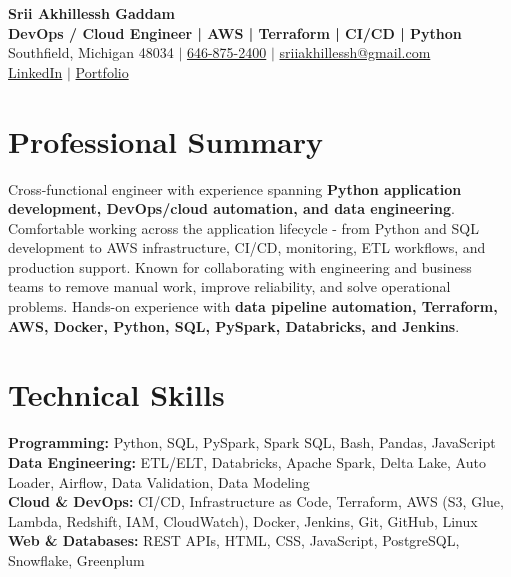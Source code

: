\documentclass[letterpaper,10pt]{article}
\begin{document}
\fontsize{9.35pt}{10.45pt}\selectfont

\begin{center}
    {\LARGE \textbf{Srii Akhillessh Gaddam}} \\[-1pt]
    \textbf{DevOps / Cloud Engineer | AWS | Terraform | CI/CD | Python} \\[2pt]
    Southfield, Michigan 48034 $|$
    \href{tel:6468752400}{646-875-2400} $|$
    \href{mailto:sriiakhillessh@gmail.com}{sriiakhillessh@gmail.com} \\[1pt]
    \href{https://www.linkedin.com/in/srii-akhiilessh-gaddam-b48668191/}{LinkedIn} $|$
    \href{https://sriiakhillesshg.github.io/portfolio/}{Portfolio}
\end{center}
\vspace{-8pt}

\section{Professional Summary}
\small{Cross-functional engineer with experience spanning \textbf{Python application development, DevOps/cloud automation, and data engineering}. Comfortable working across the application lifecycle - from Python and SQL development to AWS infrastructure, CI/CD, monitoring, ETL workflows, and production support. Known for collaborating with engineering and business teams to remove manual work, improve reliability, and solve operational problems. Hands-on experience with \textbf{data pipeline automation, Terraform, AWS, Docker, Python, SQL, PySpark, Databricks, and Jenkins}.}

\section{Technical Skills}
\small{
\textbf{Programming:} Python, SQL, PySpark, Spark SQL, Bash, Pandas, JavaScript \\
\textbf{Data Engineering:} ETL/ELT, Databricks, Apache Spark, Delta Lake, Auto Loader, Airflow, Data Validation, Data Modeling \\
\textbf{Cloud \& DevOps:} CI/CD, Infrastructure as Code, Terraform, AWS (S3, Glue, Lambda, Redshift, IAM, CloudWatch), Docker, Jenkins, Git, GitHub, Linux \\
\textbf{Web \& Databases:} REST APIs, HTML, CSS, JavaScript, PostgreSQL, Snowflake, Greenplum
}
\end{document}
